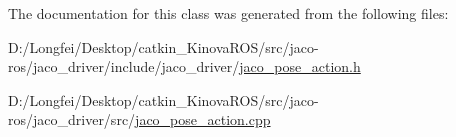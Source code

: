 The documentation for this class was generated from the following files\+:\begin{DoxyCompactItemize}
\item 
D\+:/\+Longfei/\+Desktop/catkin\+\_\+\+Kinova\+R\+O\+S/src/jaco-\/ros/jaco\+\_\+driver/include/jaco\+\_\+driver/\hyperlink{jaco__pose__action_8h}{jaco\+\_\+pose\+\_\+action.\+h}\item 
D\+:/\+Longfei/\+Desktop/catkin\+\_\+\+Kinova\+R\+O\+S/src/jaco-\/ros/jaco\+\_\+driver/src/\hyperlink{jaco__pose__action_8cpp}{jaco\+\_\+pose\+\_\+action.\+cpp}\end{DoxyCompactItemize}
